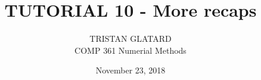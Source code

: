  

 

\title{TUTORIAL 10 - More recaps}%
\author{TRISTAN GLATARD\\ %
COMP 361 Numerial Methods} %
\date{November 23, 2018} 
\maketitle

